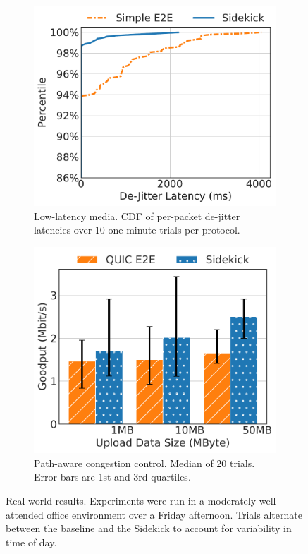 \begin{figure}[t]
\centering
\begin{subfigure}{0.48\linewidth}
	\includegraphics[width=\linewidth]{sidekick-paper/figures/fig8_real_world_webrtc.pdf}
	\caption{Low-latency media. CDF of per-packet de-jitter
	latencies over 10 one-minute trials per protocol.}
	\label{fig:real-world:scenario1}
\end{subfigure}
\begin{subfigure}{0.48\linewidth}
	\includegraphics[width=\linewidth]{sidekick-paper/figures/fig8_real_world_retx.pdf}
	\caption{Path-aware congestion control.
	Median of 20 trials. Error bars are 1st and 3rd quartiles.}
	\label{fig:real-world:scenario2}
\end{subfigure}
\caption{Real-world results. Experiments were run in a moderately well-attended
office environment over a Friday afternoon. Trials alternate between the
baseline and the Sidekick to account for variability in time of day.
}
\label{fig:real-world}
\end{figure}
